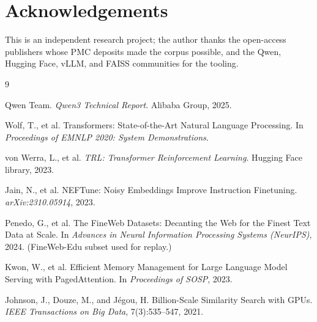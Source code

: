 \documentclass[11pt]{article}
\begin{document}
\section*{Acknowledgements}

This is an independent research project; the author thanks the open-access
publishers whose PMC deposits made the corpus possible, and the Qwen,
Hugging Face, vLLM, and FAISS communities for the tooling.

\begin{thebibliography}{9}

Qwen Team.
\newblock \emph{Qwen3 Technical Report}.
\newblock Alibaba Group, 2025.

Wolf, T., et al.
\newblock Transformers: State-of-the-Art Natural Language Processing.
\newblock In \emph{Proceedings of EMNLP 2020: System Demonstrations}.

von Werra, L., et al.
\newblock \emph{TRL: Transformer Reinforcement Learning}.
\newblock Hugging Face library, 2023.

Jain, N., et al.
\newblock NEFTune: Noisy Embeddings Improve Instruction Finetuning.
\newblock \emph{arXiv:2310.05914}, 2023.

Penedo, G., et al.
\newblock The FineWeb Datasets: Decanting the Web for the Finest Text Data
at Scale.
\newblock In \emph{Advances in Neural Information Processing Systems
(NeurIPS)}, 2024.
\newblock (FineWeb-Edu subset used for replay.)

Kwon, W., et al.
\newblock Efficient Memory Management for Large Language Model Serving
with PagedAttention.
\newblock In \emph{Proceedings of SOSP}, 2023.

Johnson, J., Douze, M., and J\'egou, H.
\newblock Billion-Scale Similarity Search with GPUs.
\newblock \emph{IEEE Transactions on Big Data}, 7(3):535--547, 2021.

\end{thebibliography}
\end{document}
